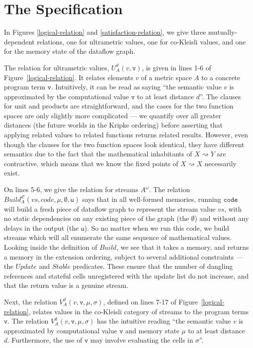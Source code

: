 \documentclass[nocopyrightspace,preprint]{sigplanconf}
\newcommand{\term}[1]{\ensuremath{\mathtt{{#1}}}}
\newcommand{\shrink}{\rightsquigarrow}
\newcommand{\Build}{\mathit{Build}}
\newcommand{\Update}{\mathit{Update}}
\newcommand{\Stable}{\mathit{Stable}}
\newcommand{\U}{\mathsf{u}}
\begin{document}
\section{The Specification}

In Figures \ref{logical-relation} and \ref{satisfaction-relation}, we
give three mutually-dependent relations, one for ultrametric values,
one for co-Kleisli values, and one for the memory state of the
dataflow graph. 

The relation for ultrametric values, $U^d_A(v, \term{v})$, is given in
lines 1-6 of Figure~\ref{logical-relation}. It relates elements $v$ of
a metric space $A$ to a concrete program term \term{v}. Intuitively,
it can be read as saying ``the semantic value $v$ is approximated by
the computational value \term{v} to at least distance $d$''. The
clauses for unit and products are straightforward, and the cases for
the two function spaces are only slightly more complicated --- we
quantify over all greater distances (the future worlds in the Kripke
ordering) before asserting that applying related values to related
functions returns related results. However, even though the clauses
for the two function spaces look identical, they have different
semantics due to the fact that the mathematical inhabitants of $X
\shrink Y$ are contractive, which means that we know the fixed points
of $X \shrink X$ necessarily exist.

On lines 5-6, we give the relation for streams $A^\omega$. The
relation $\Build^{d'}_A(vs, code, \mu, \emptyset, \U)$ says that in
all well-formed memories, running \term{code} will build a fresh piece
of dataflow graph to represent the stream value $vs$, with no static
dependencies on any existing piece of the graph (the $\emptyset$) and
without any delays in the output (the $\U$). So no matter when we run
this code, we build streams which will all enumerate the same sequence
of mathematical values. Looking inside the definition of $\Build$,
we see that it takes a memory, and returns a memory in the extension
ordering, subject to several additional constraints --- the $\Update$
and $\Stable$ predicates. These ensure that the number of dangling
references and stateful cells unregistered with the update list 
do not increase, and that the return value is a genuine stream. 

Next, the relation $V^d_A(v, \term{v}, \mu, \sigma)$, defined on lines
7-17 of Figure~\ref{logical-relation}, relates values in the
co-Kleisli category of streams to the program terms \term{v}. The
relation $V^d_A(v, \term{v}, \mu, \sigma)$ has the intuitive reading
``the semantic value $v$ is approximated by computational value
\term{v} and memory state $\mu$ to at least distance $d$. Furthermore,
the use of \term{v} may involve evaluating the cells in $\sigma$''.
\end{document}
